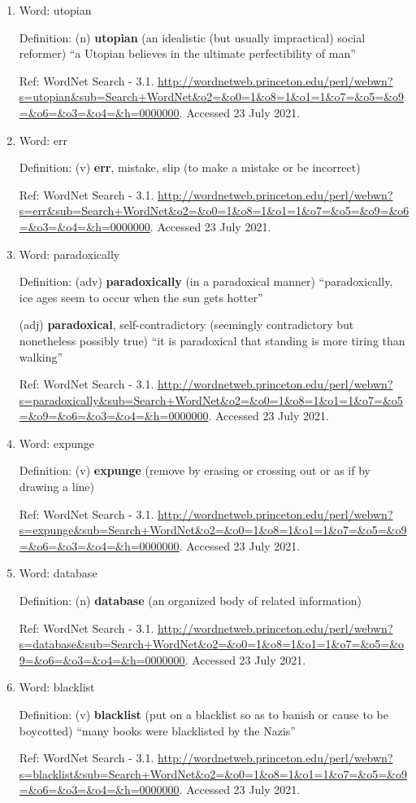 \documentclass{scrartcl}
\begin{document}
\begin{enumerate}
\item Word: utopian

Definition: (n) \textbf{utopian} (an idealistic (but usually impractical) social reformer) ``a Utopian believes in the ultimate perfectibility of man''

Ref: WordNet Search - 3.1. \url{http://wordnetweb.princeton.edu/perl/webwn?s=utopian\&sub=Search+WordNet\&o2=\&o0=1\&o8=1\&o1=1\&o7=\&o5=\&o9=\&o6=\&o3=\&o4=\&h=0000000}. Accessed 23 July 2021.

\item Word: err

Definition: (v) \textbf{err}, mistake, slip (to make a mistake or be incorrect)

Ref: WordNet Search - 3.1. \url{http://wordnetweb.princeton.edu/perl/webwn?s=err\&sub=Search+WordNet\&o2=\&o0=1\&o8=1\&o1=1\&o7=\&o5=\&o9=\&o6=\&o3=\&o4=\&h=0000000}. Accessed 23 July 2021.

\item Word: paradoxically

Definition: (adv) \textbf{paradoxically} (in a paradoxical manner) ``paradoxically,  ice ages seem to occur when the sun gets hotter''

(adj) \textbf{paradoxical}, self-contradictory (seemingly contradictory but nonetheless possibly true) ``it is paradoxical that standing is more tiring than walking''

Ref: WordNet Search - 3.1. \url{http://wordnetweb.princeton.edu/perl/webwn?s=paradoxically\&sub=Search+WordNet\&o2=\&o0=1\&o8=1\&o1=1\&o7=\&o5=\&o9=\&o6=\&o3=\&o4=\&h=0000000}. Accessed 23 July 2021.

\item Word: expunge

Definition: (v)  \textbf{expunge} (remove by erasing or crossing out or as if by drawing a line)

Ref: WordNet Search - 3.1.
\url{http://wordnetweb.princeton.edu/perl/webwn?s=expunge\&sub=Search+WordNet\&o2=\&o0=1\&o8=1\&o1=1\&o7=\&o5=\&o9=\&o6=\&o3=\&o4=\&h=0000000}. Accessed 23 July 2021.

\item Word: database

Definition: (n) \textbf{database} (an organized body of related information)

Ref: WordNet Search - 3.1.
\url{http://wordnetweb.princeton.edu/perl/webwn?s=database\&sub=Search+WordNet\&o2=\&o0=1\&o8=1\&o1=1\&o7=\&o5=\&o9=\&o6=\&o3=\&o4=\&h=0000000}. Accessed 23 July 2021.

\item Word: blacklist

Definition: (v) \textbf{blacklist} (put on a blacklist so as to banish or cause to be boycotted) ``many books were blacklisted by the Nazis''

Ref: WordNet Search - 3.1.
\url{http://wordnetweb.princeton.edu/perl/webwn?s=blacklist\&sub=Search+WordNet\&o2=\&o0=1\&o8=1\&o1=1\&o7=\&o5=\&o9=\&o6=\&o3=\&o4=\&h=0000000}. Accessed 23 July 2021.
\end{enumerate}
\end{document}

